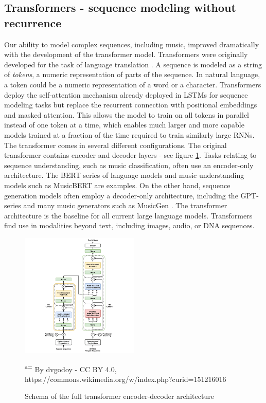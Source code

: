 \subsection{Transformers - sequence modeling without recurrence}
Our ability to model complex sequences, including music, improved dramatically with the development of the transformer model.  Transformers were originally developed for the task of language translation \cite{Vaswani_Shazeer_Parmar_Uszkoreit_Jones_Gomez_Kaiser_Polosukhin_2017}. A sequence is modeled as a string of \textit{tokens}, a numeric representation of parts of the sequence. In natural language, a token could be a numeric representation of a word or a character. Transformers deploy the self-attention mechanism already deployed in LSTMs for sequence modeling tasks \cite{Sutskever_Vinyals_Le_2014} but replace the recurrent connection with positional embeddings and masked attention. This allows the model to train on all tokens in parallel instead of one token at a time, which enables much larger and more capable models trained at a fraction of the time required to train similarly large RNNs. The transformer comes in several different configurations. The original transformer contains encoder and decoder layers - see figure \ref{fig:transformer}. Tasks relating to sequence understanding, such as music classification, often use an encoder-only architecture. The BERT series of language models \cite{Devlin_Chang_Lee_ToutanovaBERT_2019} and music understanding models such as MusicBERT \cite{Zeng_Tan_Wang_MUSICBERT_2021} are examples. 
On the other hand, sequence generation models often employ a decoder-only architecture, including the GPT-series \cite{Radford_Wu_Child_Luan_gpt2_2019} and many music generators such as MusicGen \cite{copet2023simple}. The transformer architecture is the baseline for all current large language models. Transformers find use in modalities beyond text, including images, audio, or DNA sequences. 

\begin{figure}[H]
\centering
\includegraphics[width=0.5\textwidth]{IMAGES/Transformer,_full_architecture.png} 
\caption{Schema of the full transformer encoder-decoder architecture}
\small\textsuperscript{a=} By dvgodoy - CC BY 4.0, https://commons.wikimedia.org/w/index.php?curid=151216016
\label{fig:transformer}
\end{figure}


